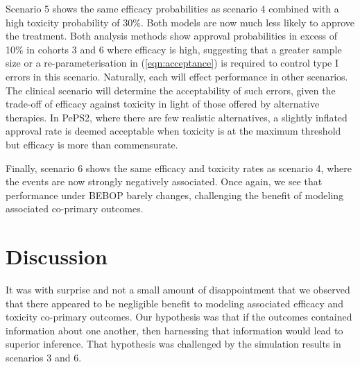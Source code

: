 \documentclass[alpha-refs]{wiley-article}
\begin{document}
Scenario 5 shows the same efficacy probabilities as scenario 4 combined with a high toxicity probability of 30\%.
Both models are now much less likely to approve the treatment.
Both analysis methods show approval probabilities in excess of 10\% in cohorts 3 and 6 where efficacy is high, suggesting that a greater sample size or a re-parameterisation in (\ref{eqn:acceptance}) is required to control type I errors in this scenario.
Naturally, each will effect performance in other scenarios.
The clinical scenario will determine the acceptability of such errors, given the trade-off of efficacy against toxicity in light of those offered by alternative therapies.
In PePS2, where there are few realistic alternatives, a slightly inflated approval rate is deemed acceptable when toxicity is at the maximum threshold but efficacy is more than commensurate.

Finally, scenario 6 shows the same efficacy and toxicity rates as scenario 4, where the events are now strongly negatively associated.
Once again, we see that performance under BEBOP barely changes, challenging the benefit of modeling associated co-primary outcomes.


\section{Discussion}
\label{s:discussion}
It was with surprise and not a small amount of disappointment that we observed that there appeared to be negligible benefit to modeling associated efficacy and toxicity co-primary outcomes.
Our hypothesis was that if the outcomes contained information about one another, then harnessing that information would lead to superior inference.
That hypothesis was challenged by the simulation results in scenarios 3 and 6.
\end{document}
